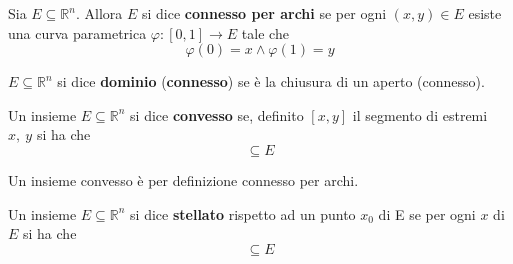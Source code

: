 \begin{definition}
    Sia $E \subseteq \mathbb{R}^n$. Allora $E$ si dice \textbf{connesso per archi} se per ogni $(x,y) \in E$ esiste una curva parametrica $\varphi:[0,1] \to E$ tale che
    \begin{equation}
        \varphi(0)=x \land \varphi(1)=y
    \end{equation}
\end{definition}
\begin{definition}
   $E \subseteq \mathbb{R}^n$ si dice \textbf{dominio} (\textbf{connesso}) se è la chiusura di un aperto (connesso).
\end{definition}
\begin{definition}
    Un insieme $E \subseteq \mathbb{R}^n$ si dice \textbf{convesso} se, definito $[x,y]$ il segmento di estremi $x,\ y$ si ha che
    \begin{equation}
        [x,y] \subseteq E
    \end{equation}
    \begin{oss}
        Un insieme convesso è per definizione connesso per archi.
    \end{oss}
\end{definition}
\begin{definition}
    Un insieme $E \subseteq \mathbb{R}^n$ si dice \textbf{stellato} rispetto ad un punto $x_0$ di E se per ogni $x$ di $E$ si ha che
    \begin{equation}
        [x_0, x] \subseteq E
    \end{equation}
\end{definition}



